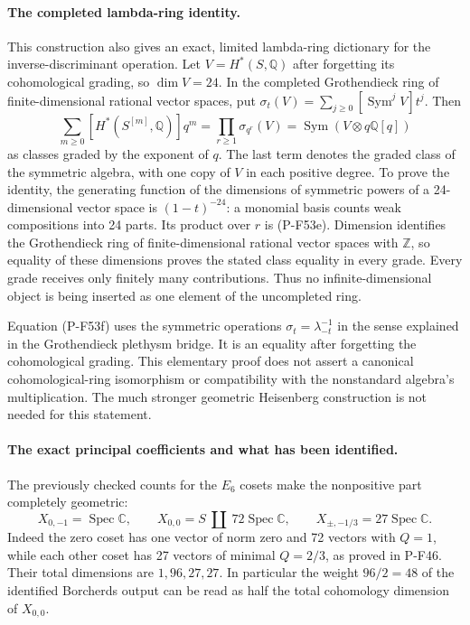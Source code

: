 \paragraph{The completed lambda-ring identity.}
This construction also gives an exact, limited lambda-ring
dictionary for the inverse-discriminant operation. Let
$V=H^*(S,\mathbb Q)$ after forgetting its cohomological
grading, so $\dim V=24$. In the completed Grothendieck
ring of finite-dimensional rational vector spaces, put
$\sigma_t(V)=\sum_{j\ge0}[\operatorname{Sym}^jV]t^j$.
Then
\[
 \sum_{m\ge0}[H^*(S^{[m]},\mathbb Q)]q^m
   =\prod_{r\ge1}\sigma_{q^r}(V)
   =\operatorname{Sym}\!\left(V\otimes q\mathbb Q[q]\right)
                                                        \tag{P-F53f}
\]
as classes graded by the exponent of $q$. The last term
denotes the graded class of the symmetric algebra, with
one copy of $V$ in each positive degree. To prove the
identity, the generating function of the dimensions
of symmetric powers of a 24-dimensional vector space
is $(1-t)^{-24}$: a monomial basis counts weak
compositions into 24 parts. Its product over $r$
is (P-F53e). Dimension identifies the Grothendieck
ring of finite-dimensional rational vector spaces
with $\mathbb Z$, so equality of these dimensions
proves the stated class equality in every grade.
Every grade receives only finitely many contributions.
Thus no infinite-dimensional object is being inserted
as one element of the uncompleted ring.

Equation (P-F53f) uses the symmetric operations
$\sigma_t=\lambda_{-t}^{-1}$ in the sense explained in
the Grothendieck plethysm bridge. It is an equality
after forgetting the cohomological grading. This
elementary proof does not assert a canonical
cohomological-ring isomorphism or compatibility with
the nonstandard algebra's multiplication. The much
stronger geometric Heisenberg construction is not
needed for this statement.

\paragraph{The exact principal coefficients and what has been identified.}
The previously checked counts for the $E_6$ cosets
make the nonpositive part completely geometric:
\[
 X_{0,-1}=\operatorname{Spec}\mathbb C,\qquad
 X_{0,0}=S\ \coprod\ 72\operatorname{Spec}\mathbb C,
 \qquad
 X_{\pm,-1/3}=27\operatorname{Spec}\mathbb C.
                                                        \tag{P-F53g}
\]
Indeed the zero coset has one vector of norm zero
and 72 vectors with $Q=1$, while each other coset
has 27 vectors of minimal $Q=2/3$, as proved in
P-F46. Their total dimensions are $1,96,27,27$.
In particular the weight $96/2=48$ of the identified
Borcherds output can be read as half the total
cohomology dimension of $X_{0,0}$.

